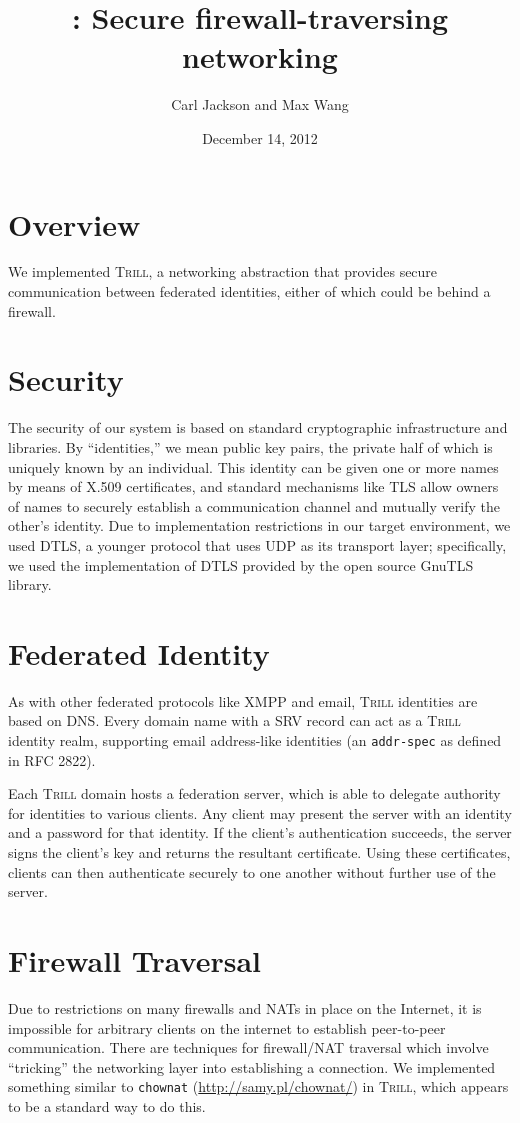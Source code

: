 \documentclass[12pt]{article}
\title{\Trill: Secure firewall-traversing networking}
\author{Carl Jackson and Max Wang}
\date{December 14, 2012}
\makeatletter
\newcommand{\Trill}{\textsc{Trill}\xspace}
\renewcommand{\maketitle}{%
  \thispagestyle{plain}%
  \begin{center}%
    {\LARGE \@title \par}%
    {\large \@author \par}%
    {\large \@date \par}%
  \end{center}%
}
\makeatother
\begin{document}
\maketitle

\section*{Overview}
We implemented \Trill, a networking abstraction that provides secure
communication between federated identities, either of which could be behind a
firewall.

\section*{Security}
The security of our system is based on standard cryptographic infrastructure and
libraries. By ``identities,'' we mean public key pairs, the private half of
which is uniquely known by an individual. This identity can be given one or more
names by means of X.509 certificates, and standard mechanisms like TLS allow
owners of names to securely establish a communication channel and mutually
verify the other's identity. Due to implementation restrictions in our target
environment, we used DTLS, a younger protocol that uses UDP as its transport
layer; specifically, we used the implementation of DTLS provided by the open
source GnuTLS library.

\section*{Federated Identity}
As with other federated protocols like XMPP and email, \Trill identities are
based on DNS.  Every domain name with a SRV record can act as a \Trill identity
realm, supporting email address-like identities (an \verb!addr-spec!  as defined
in RFC 2822).

Each \Trill domain hosts a federation server, which is able to delegate
authority for identities to various clients.  Any client may present the server
with an identity and a password for that identity.  If the client's
authentication succeeds, the server signs the client's key and returns the
resultant certificate.  Using these certificates, clients can then authenticate
securely to one another without further use of the server.

\section*{Firewall Traversal}
Due to restrictions on many firewalls and NATs in place on the Internet, it is
impossible for arbitrary clients on the internet to establish peer-to-peer
communication. There are techniques for firewall/NAT traversal which involve
``tricking'' the networking layer into establishing a connection. We implemented
something similar to \texttt{chownat} (\url{http://samy.pl/chownat/}) in \Trill,
which appears to be a standard way to do this.
\end{document}
